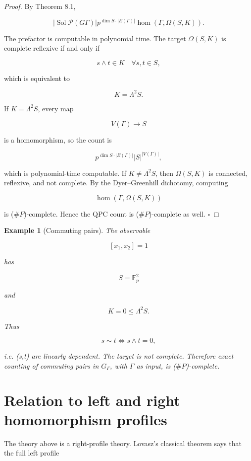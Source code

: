 \documentclass[11pt]{article}
\newtheorem{example}[theorem]{Example}
\begin{document}
\begin{proof}
By Theorem 8.1,

\[
|\operatorname{Sol}
{\mathcal P}(G
\Gamma)|
p^{\dim S\cdot |E(\Gamma)|}
\operatorname{hom}(\Gamma,\Omega(S,K)).
\]

The prefactor is computable in polynomial time. The target $\Omega(S,K)$ is complete reflexive if and only if

\[
s\wedge t\in K
\quad
\forall s,t\in S,
\]

which is equivalent to

\[
K=\Lambda^2S.
\]

If $K=\Lambda^2S$, every map

\[
V(\Gamma)\to S
\]

is a homomorphism, so the count is

\[
p^{\dim S\cdot |E(\Gamma)|}|S|^{|V(\Gamma)|},
\]

which is polynomial-time computable. If $K\ne\Lambda^2S$, then $\Omega(S,K)$ is connected, reflexive, and not complete. By the Dyer--Greenhill dichotomy, computing

\[
\operatorname{hom}(\Gamma,\Omega(S,K))
\]

is ($\#P$)-complete. Hence the QPC count is ($\#P$)-complete as well. $\square$

\end{proof}

\begin{example}[Commuting pairs]
The observable

\[
[x_1,x_2]=1
\]

has

\[
S=\mathbb F_p^2
\]

and

\[
K=0\le\Lambda^2S.
\]

Thus

\[
s\sim t
\iff s\wedge t=0,
\]

i.e. (s,t) are linearly dependent. The target is not complete. Therefore exact counting of commuting pairs in $G_\Gamma$, with $\Gamma$ as input, is ($\#P$)-complete.

\end{example}

\section{Relation to left and right homomorphism profiles}

The theory above is a right-profile theory. Lovasz's classical theorem says that the full left profile
\end{document}
